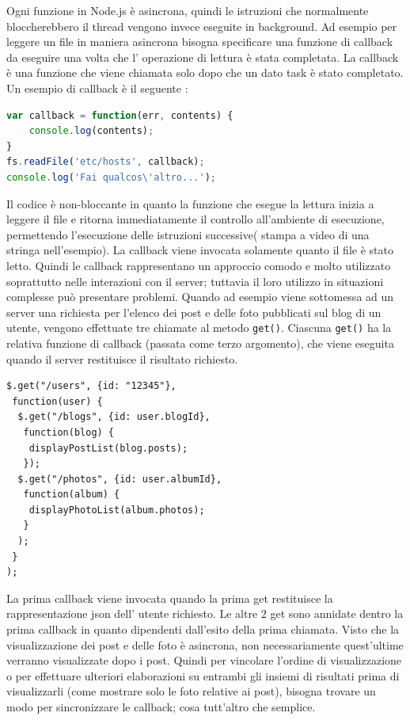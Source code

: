 Ogni funzione in Node.js è asincrona, quindi le istruzioni che normalmente bloccherebbero il thread vengono invece eseguite in background.
Ad esempio per leggere un file in maniera asincrona bisogna specificare una funzione di callback da eseguire una volta che l’ operazione di lettura è stata completata.
La callback è una funzione che viene chiamata solo dopo che un dato task è stato completato.
Un esempio di callback è il seguente :
\begin{lstlisting}[language=JavaScript]
var callback = function(err, contents) {
	console.log(contents);
}
fs.readFile('etc/hosts', callback);
console.log('Fai qualcos\'altro...');
\end{lstlisting}
Il codice è non-bloccante in quanto la funzione che esegue la lettura inizia a leggere il file e ritorna immediatamente il controllo all’ambiente di esecuzione, permettendo l’esecuzione delle istruzioni successive( stampa a video di una stringa nell’esempio). 
La callback viene invocata solamente quanto il file è stato letto.
Quindi le callback rappresentano un approccio comodo e molto utilizzato soprattutto nelle interazioni con il server; tuttavia il loro utilizzo in situazioni complesse può presentare problemi.
Quando ad esempio viene sottomessa ad un server una richiesta per l’elenco dei post e delle foto pubblicati sul blog di un utente, vengono effettuate tre chiamate al metodo \texttt{get()}. 
Ciascuna \texttt{get()} ha la relativa funzione di callback (passata come terzo argomento), che viene eseguita quando il server restituisce il risultato richiesto.
\begin{lstlisting}
$.get("/users", {id: "12345"},
 function(user) {
  $.get("/blogs", {id: user.blogId},
   function(blog) {
   	displayPostList(blog.posts);
   });
  $.get("/photos", {id: user.albumId},
   function(album) {
   	displayPhotoList(album.photos);
   }
  );	
 }
);
\end{lstlisting}
La prima callback viene invocata quando la prima get restituisce la rappresentazione json dell’ utente richiesto. Le altre 2 get sono annidate dentro la prima callback in quanto dipendenti dall’esito della prima chiamata. 
Visto che la visualizzazione dei post e delle foto è asincrona, non necessariamente quest’ultime verranno visualizzate dopo i post. Quindi per vincolare l’ordine di visualizzazione o per effettuare ulteriori elaborazioni su entrambi gli insiemi di risultati prima di visualizzarli (come mostrare solo le foto relative ai post), bisogna trovare un modo per sincronizzare le callback; cosa tutt’altro che semplice.
